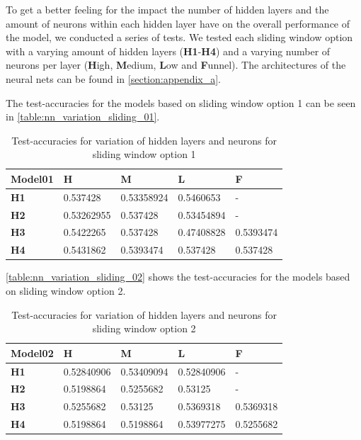 To get a better feeling for the impact the number of hidden layers and the amount of neurons within each hidden layer have on the overall performance of the model, we conducted a series of tests.\newline
We tested each sliding window option with a varying amount of hidden layers (\textbf{H1}-\textbf{H4}) and a varying number of neurons per layer (\textbf{H}igh, \textbf{M}edium, \textbf{L}ow and \textbf{F}unnel).\newline
The architectures of the neural nets can be found in \autoref{section:appendix_a}.\newline

The test-accuracies for the models based on sliding window option 1 can be seen in \autoref{table:nn_variation_sliding_01}.

\begin{table}
\centering
\begin{tabular}{|l|l|l|l|l|}
\hline

\textbf{Model01} & \textbf{H} & \textbf{M} & \textbf{L} & \textbf{F} \\ \hline
\textbf{H1} & 0.537428 & 0.53358924 & 0.5460653 & - \\ \hline
\textbf{H2} & 0.53262955 & 0.537428 & 0.53454894 & - \\ \hline
\textbf{H3} & 0.5422265 & 0.537428 & 0.47408828 & 0.5393474 \\ \hline
\textbf{H4} & 0.5431862 & 0.5393474 & 0.537428 & 0.537428 \\ \hline

\end{tabular}
\caption{Test-accuracies for variation of hidden layers and neurons for sliding window option 1}
\label{table:nn_variation_sliding_01}
\end{table}

\autoref{table:nn_variation_sliding_02} shows the test-accuracies for the models based on sliding window option 2.

\begin{table}
\centering
\begin{tabular}{|l|l|l|l|l|}
\hline

\textbf{Model02} & \textbf{H} & \textbf{M} & \textbf{L} & \textbf{F} \\ \hline
\textbf{H1} & 0.52840906 & 0.53409094 & 0.52840906 & - \\ \hline
\textbf{H2} & 0.5198864 & 0.5255682 & 0.53125 & - \\ \hline
\textbf{H3} & 0.5255682 & 0.53125 & 0.5369318 & 0.5369318 \\ \hline
\textbf{H4} & 0.5198864 & 0.5198864 & 0.53977275 & 0.5255682 \\ \hline

\end{tabular}
\caption{Test-accuracies for variation of hidden layers and neurons for sliding window option 2}
\label{table:nn_variation_sliding_02}
\end{table}

